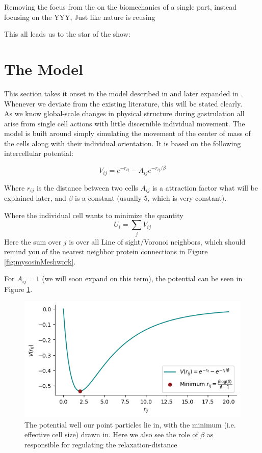 Removing the focus from the on the biomechanics of a single part, instead focusing on the YYY, Just like nature is reusing

This all leads us to the star of the show:

\section{The Model}

This section takes it onset in the model described in  and later expanded in . Whenever we deviate from the existing literature, this will be stated clearly.\\

As we know global-scale changes in physical structure during gastrulation all arise from single cell actions with little discernible individual movement. The model is built around simply simulating the movement of the center of mass of the cells along with their individual orientation. It is based on the following intercellular potential: \reph

\begin{equation}
    V_{ij}=e^{-r_{ij}}-A_{ij}e^{-r_{ij}/\beta}
\end{equation}

Where $r_{ij}$ is the distance between two cells $A_{ij}$ is a attraction factor what will be explained later, and $\beta$ is a constant (usually 5, which is very constant). 

Where the individual cell wants to minimize the quantity 
\begin{equation}
    U_i = \sum_j V_{ij}
    \label{eq:totalPot}
\end{equation}
Here the sum over $j$ is over all Line of sight/Voronoi neighbors, which should remind you of the nearest neighbor protein connections in Figure \ref{fig:mysosinMeshwork}. 


For $A_{ij}=1$ (we will soon expand on this term), the potential can be seen in Figure \ref{fig:potential}.
\begin{figure}[H]
    \centering
    \includegraphics[width=1.\linewidth]{chapters/Theory/figures/potential.png}
    \caption{The potential well our point particles lie in, with the minimum (i.e. effective cell size) drawn in. Here we also see the role of $\beta$ as responsible for regulating the relaxation-distance}
    \label{fig:potential}
\end{figure}

